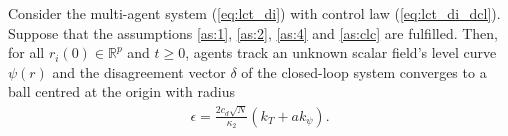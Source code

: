 \begin{theorem}
Consider the multi-agent system (\ref{eq:lct_di}) with control law (\ref{eq:lct_di_dcl}). Suppose that the assumptions \ref{as:1}, \ref{as:2}, \ref{as:4} and \ref{as:clc} are fulfilled. Then, for all $r_i(0) \in \mathbb{R}^p $ and $t \geq 0$, agents track an unknown scalar field's level curve $\psi(r)$ and the disagreement vector  $\delta$ of the closed-loop system converges to a ball centred at the origin with radius
\begin{align}\label{eq:lct_radiusdi}
\epsilon=  \frac{2 c_d \sqrt{N}}{\kappa_2}(k_T+ak_{\psi}).
\end{align}
\end{theorem}
%
%
%


